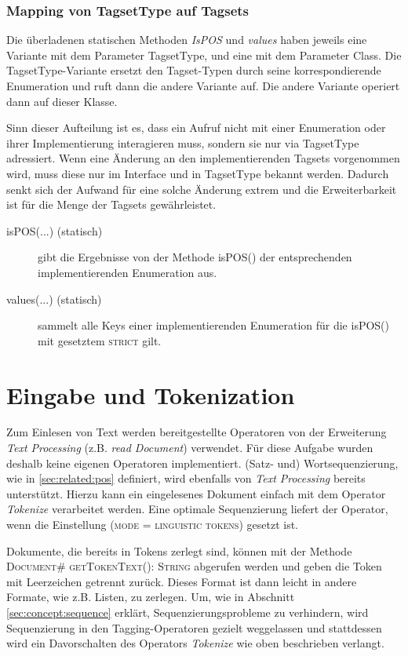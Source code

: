 \subsubsection{Mapping von TagsetType auf Tagsets}

Die überladenen statischen Methoden \textit{IsPOS} und \textit{values} haben jeweils eine Variante mit dem Parameter TagsetType, und eine mit dem Parameter Class. Die TagsetType-Variante ersetzt den Tagset-Typen durch seine korrespondierende Enumeration und ruft dann die andere Variante auf. Die andere Variante operiert dann auf dieser Klasse.

Sinn dieser Aufteilung ist es, dass ein Aufruf nicht mit einer Enumeration oder ihrer Implementierung interagieren muss, sondern sie nur via TagsetType adressiert. Wenn eine Änderung an den implementierenden Tagsets vorgenommen wird, muss diese nur im Interface und in TagsetType bekannt werden. Dadurch senkt sich der Aufwand für eine solche Änderung extrem und die Erweiterbarkeit ist für die Menge der Tagsets gewährleistet.

\begin{description}
\item[isPOS(...) (statisch)] gibt die Ergebnisse von der Methode isPOS() der entsprechenden implementierenden Enumeration aus.
\item[values(...) (statisch)] sammelt alle Keys einer implementierenden Enumeration für die isPOS() mit gesetztem \textsc{strict} gilt.
\end{description}

\section{Eingabe und Tokenization}
Zum Einlesen von Text werden bereitgestellte Operatoren von der Erweiterung \textit{Text Processing} (z.B. \textit{read Document}) verwendet. Für diese Aufgabe wurden deshalb keine eigenen Operatoren implementiert. (Satz- und) Wortsequenzierung, wie in \ref{sec:related:pos} definiert, wird ebenfalls von \textit{Text Processing} bereits unterstützt. Hierzu kann ein eingelesenes Dokument einfach mit dem Operator \textit{Tokenize} verarbeitet werden. Eine optimale Sequenzierung liefert der Operator, wenn die Einstellung \textsc{(mode = linguistic tokens)} gesetzt ist.

 Dokumente, die bereits in Tokens zerlegt sind, können mit der Methode \textsc{Document\# getTokenText(): String} abgerufen werden und geben die Token mit Leerzeichen getrennt zurück. Dieses Format ist dann leicht in andere Formate, wie z.B. Listen, zu zerlegen. Um, wie in Abschnitt \ref{sec:concept:sequence} erklärt, Sequenzierungsprobleme zu verhindern, wird Sequenzierung in den Tagging-Operatoren gezielt weggelassen und stattdessen wird ein Davorschalten des Operators \textit{Tokenize} wie oben beschrieben verlangt.

